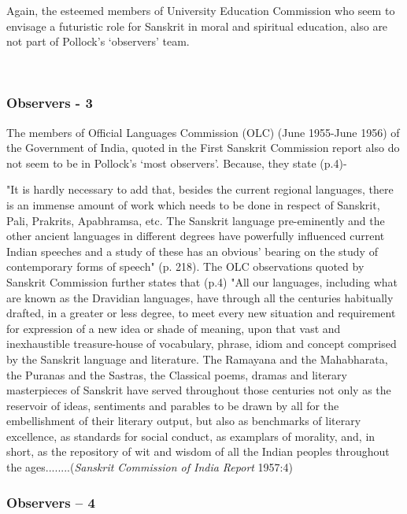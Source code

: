 Again, the esteemed members of University Education Commission who seem to envisage a futuristic role for Sanskrit in moral and spiritual education, also are not part of Pollock’s ‘observers’ team.

~\\[-40pt]

\subsubsection{Observers - 3}
\vskip -5pt

The members of Official Languages Commission (OLC) (June 1955-June 1956) of the Government of India, quoted in the First Sanskrit Commission report also do not seem to be in Pollock’s ‘most observers’. Because, they state (p.4)-
\begin{myquote}
\eleven
"It is hardly necessary to add that, besides the current regional languages, there is an immense amount of work which needs to be done in respect of Sanskrit, Pali, Prakrits, Apabhramsa, etc. The Sanskrit language pre-eminently and the other ancient languages in different degrees have powerfully influenced current Indian speeches and a study of these has an obvious' bearing on the study of contemporary forms of speech" (p. 218). The OLC observations quoted by Sanskrit Commission further states that (p.4) "All our languages, including what are known as the Dravidian languages, have through all the centuries habitually drafted, in a greater or less degree, to meet every new situation and requirement for expression of a new idea or shade of meaning, upon that vast and inexhaustible treasure-house of vocabulary, phrase, idiom and concept comprised by the Sanskrit language and literature. The Ramayana and the Mahabharata, the Puranas and the Sastras, the Classical poems, dramas and literary masterpieces of Sanskrit have served throughout those centuries not only as the reservoir of ideas, sentiments and parables to be drawn by all for the embellishment of their literary output, but also as benchmarks of literary excellence, as standards for social conduct, as examplars of morality, and, in short, as the repository of wit and wisdom of all the Indian peoples throughout the ages........\hfill ({\sl Sanskrit Commission of India Report} 1957:4)
\end{myquote}

\subsubsection{Observers – 4}

